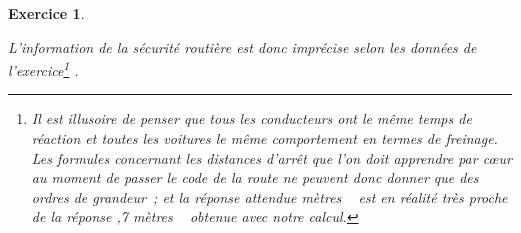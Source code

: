 \documentclass[10pt]{article}
\newtheorem{exo}{Exercice}
\begin{document}
\begin{exo}
\begin{enumerate}
L'information de la sécurité routière est donc imprécise selon les données de l'exercice\footnote{Il est illusoire de penser que tous les conducteurs ont le même temps de réaction et toutes les voitures le même comportement en termes de freinage. Les formules concernant les distances d'arrêt que l'on doit apprendre par cœur au moment de passer le code de la route ne peuvent donc donner que des ordres de grandeur~; et la réponse attendue  mètres \fg~{} est en réalité très proche de la réponse ,7 mètres \fg~{} obtenue avec notre calcul.} .

\end{enumerate}
\end{exo}
\end{document}
